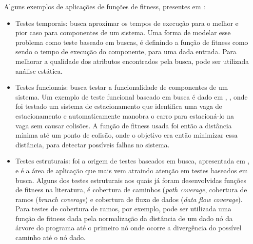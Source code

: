 \documentclass[conference]{IEEEtran}
\begin{document}
Alguns exemplos de aplicações de funções de fitness, presentes em \cite{McMinn:2011}:

\begin{itemize}
\item Testes temporais: busca aproximar os tempos de execução para o melhor e pior caso para componentes de um sistema. Uma forma de modelar esse problema como teste baseado em buscas, é definindo a função de fitness como sendo o tempo de execução do componente, para uma dada entrada. Para melhorar a qualidade dos atributos encontrados pela busca, pode ser utilizada análise estática.

\item Testes funcionais: busca testar a funcionalidade de componentes de um sistema. Um exemplo de teste funcional baseado em busca é dado em \cite{Buhler:2003}, \cite{Buhler:2008}, onde foi testado um sistema de estacionamento que identifica uma vaga de estacionamento e automaticamente manobra o carro para estacioná-lo na vaga sem causar colisões. A função de fitness usada foi então a distância mínima até um ponto de colisão, onde o objetivo era então minimizar essa distância, para detectar possíveis falhas no sistema.

\item Testes estruturais: foi a origem de testes baseados em busca, apresentada em \cite{Miller:1976}, e é a área de aplicação que mais vem atraindo atenção em testes baseados em busca. Alguns dos testes estruturais aos quais já foram desenvolvidas funções de fitness na literatura, é cobertura de caminhos (\emph{path coverage}, cobertura de ramos (\emph{branch coverage}) e cobertura de fluxo de dados (\emph{data flow coverage}). Para testes de cobertura de ramos, por exemplo, pode ser utilizada uma função de fitness dada pela normalização da distância de um dado nó da árvore do programa até o primeiro nó onde ocorre a divergência do possível caminho até o nó dado.
\end{itemize}


    
    
\end{document}
